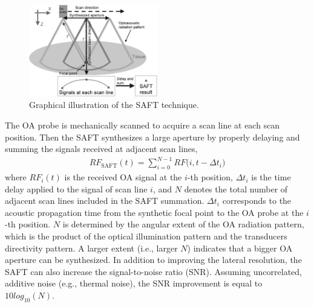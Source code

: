 \begin{figure}[htbp]
	\centering
		\includegraphics[width=0.50\textwidth]{images/theory/saft_principle.jpg}
	\caption{Graphical illustration of the SAFT technique. \cite{2004_Liao_Optoacousticimagingwith}}
	\label{fig:saft_principle}
\end{figure}
The OA probe is mechanically scanned to acquire a scan line at each scan position. Then the SAFT synthesizes a large aperture by properly delaying and summing the signals received at adjacent scan lines, 
\begin{align}
	RF_\text{SAFT}(t) = \sum_{i=0}^{N-1}{RF(i,t-\Delta t_i})
\end{align}
where $RF_i(t)$ is the received OA signal at the $i$-th position, $\Delta t_i$ is the time delay applied to the signal of scan line $i$, and $N$ denotes the total number of adjacent scan lines included in the SAFT summation. $\Delta t_i$ corresponds to the acoustic propagation time from the synthetic focal point to the OA probe at the $i$-th position. $N$ is determined by the angular extent of the OA radiation pattern, which is the product of the optical illumination pattern and the transducers directivity pattern. A larger extent (i.e., larger $N$) indicates that a bigger OA aperture can be synthesized. In addition to improving the lateral resolution, the SAFT can also increase the signal-to-noise ratio (SNR). Assuming uncorrelated, additive noise (e.g., thermal noise), the SNR improvement is equal to $10 log_{10}(N)$. \cite{2004_Liao_Optoacousticimagingwith}


 











